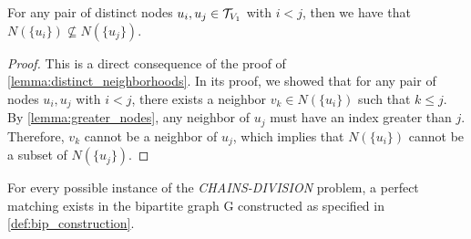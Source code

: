 \begin{claim} \label{claim:prev_not_subset}
    For any pair of distinct nodes $u_i, u_j \in \mathcal{T}_{V_1}$ with $i < j$, then we have that $N(\{u_i\}) \not\subseteq N(\{u_j\})$.
\end{claim}
\begin{proof}
    This is a direct consequence of the proof of \cref{lemma:distinct_neighborhoods}. In its proof, we showed that for any pair of nodes $u_i, u_j$ with $i < j$, there exists a neighbor $v_k \in N(\{u_i\})$ such that $k \leq j$. By \cref{lemma:greater_nodes}, any neighbor of $u_j$ must have an index greater than $j$. Therefore, $v_k$ cannot be a neighbor of $u_j$, which implies that $N(\{u_i\})$ cannot be a subset of $N(\{u_j\})$.
\end{proof}

\begin{lemma} \label{lemma:matching_existence}
    For every possible instance of the \textit{CHAINS-DIVISION} problem, a perfect matching exists in the bipartite graph G constructed as specified in \cref{def:bip_construction}.
\end{lemma}

